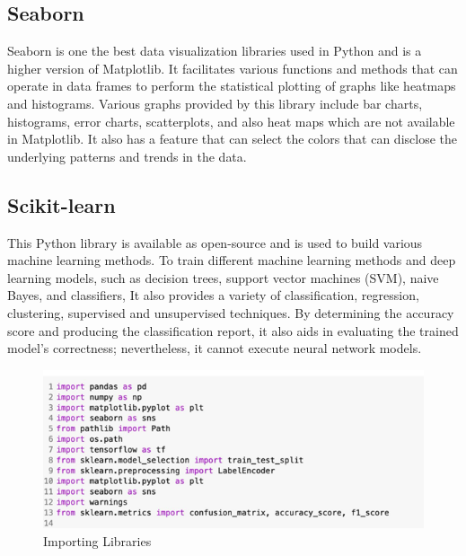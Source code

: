 \subsection{Seaborn}
Seaborn is one the best data visualization libraries used in Python and is a higher version of
Matplotlib. It facilitates various functions and methods that can operate in data frames to
perform the statistical plotting of graphs like heatmaps and histograms. Various graphs provided
by this library include bar charts, histograms, error charts, scatterplots, and also heat maps which
are not available in Matplotlib. It also has a feature that can select the colors that can disclose
the underlying patterns and trends in the data.

\subsection{Scikit-learn}
This Python library is available as open-source and is used to build various machine learning
methods. To train different machine learning methods and deep learning models, such as decision
trees, support vector machines (SVM), naive Bayes, and classifiers, It also provides a variety
of classification, regression, clustering, supervised and unsupervised techniques. By determining
the accuracy score and producing the classification report, it also aids in evaluating the trained
model’s correctness; nevertheless, it cannot execute neural network models.
\begin{figure}[ht]
    \centering
    \includegraphics[scale=0.9]{figures/libraries.png}
    \caption{Importing Libraries}
    \label{fig:chart_a}
\end{figure}





